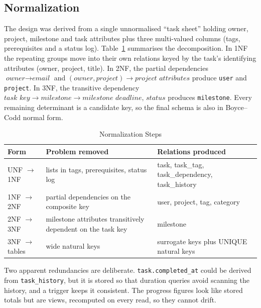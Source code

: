 \documentclass[conference]{IEEEtran}
\begin{document}
\subsection{Normalization}

The design was derived from a single unnormalised ``task sheet'' holding owner,
project, milestone and task attributes plus three multi-valued columns (tags,
prerequisites and a status log). Table~\ref{tab:nf} summarises the
decomposition. In 1NF the repeating groups move into their own relations keyed
by the task's identifying attributes (owner, project, title). In 2NF, the partial
dependencies $\textit{owner}\rightarrow\textit{email}$ and
$(\textit{owner},\textit{project})\rightarrow\textit{project attributes}$
produce \texttt{user} and \texttt{project}. In 3NF, the transitive dependency
$\textit{task key}\rightarrow\textit{milestone}\rightarrow\textit{milestone
deadline, status}$ produces \texttt{milestone}. Every remaining determinant is
a candidate key, so the final schema is also in Boyce--Codd normal form.

\begin{table}[t]
\caption{Normalization Steps}
\label{tab:nf}
\centering
\scriptsize
\setlength{\tabcolsep}{3pt}
\begin{tabular}{@{}l p{2.9cm} p{3.3cm}@{}}
\toprule
\textbf{Form} & \textbf{Problem removed} & \textbf{Relations produced} \\
\midrule
UNF $\rightarrow$ 1NF & lists in tags, prerequisites, status log & task, task\_tag, task\_dependency, task\_history \\
1NF $\rightarrow$ 2NF & partial dependencies on the composite key & user, project, tag, category \\
2NF $\rightarrow$ 3NF & milestone attributes transitively dependent on the task key & milestone \\
3NF $\rightarrow$ tables & wide natural keys & surrogate keys plus UNIQUE natural keys \\
\bottomrule
\end{tabular}
\end{table}

Two apparent redundancies are deliberate. \texttt{task.completed\_at} could be
derived from \texttt{task\_history}, but it is stored so that duration queries
avoid scanning the history, and a trigger keeps it consistent. The progress
figures look like stored totals but are views, recomputed on every read, so
they cannot drift.

\end{document}
